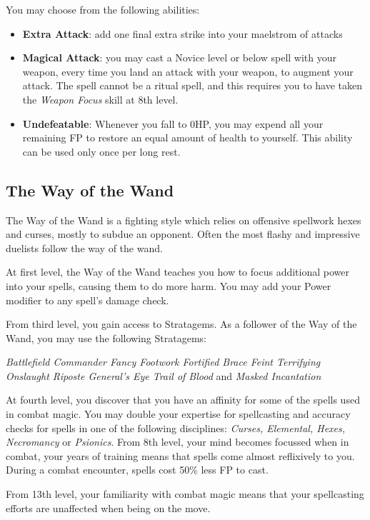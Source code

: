 {{You may choose from the following abilities:
\begin{itemize}
	\item {\bf Extra Attack}: add one final extra strike into your maelstrom of attacks
	\item {\bf Magical Attack}: you may cast a Novice level or below spell with your weapon, every time you land an attack with your weapon, to augment your attack. The spell cannot be a ritual spell, and this requires you to have taken the {\it Weapon Focus} skill at 8th level. 
	\item {\bf Undefeatable}: Whenever you fall to 0HP, you may expend all your remaining FP to restore an equal amount of health to yourself. This ability can be used only once per long rest.
\end{itemize}
}

\newpage
\subsection{\bf The Way of the Wand}

The Way of the Wand is a fighting style which relies on offensive spellwork \minus{} hexes and curses, mostly  \minus{} to subdue an opponent. Often the most flashy and impressive duelists follow the way of the wand. 

{
	At first level, the Way of the Wand teaches you how to focus additional power into your spells, causing them to do more harm. You may add your Power modifier to any spell's damage check.   
}



From third level, you gain access to Stratagems. As a follower of the Way of the Wand, you may use the following Stratagems:

{\it
Battlefield Commander\comma{} Fancy Footwork\comma{} Fortified Brace\comma{} Feint\comma{} Terrifying Onslaught\comma{} Riposte\comma{} General’s Eye\comma{} Trail of Blood } and {\it Masked Incantation
}

{
	At fourth level, you discover that you have an affinity for some of the spells used in combat magic.  You may double your expertise for spellcasting and accuracy checks for spells in one of the following disciplines: {\it  Curses, Elemental, Hexes, Necromancy} or {\it Psionics}. 
}
{
	From 8th level, your mind becomes focussed when in combat, your years of training means that spells come almost reflixively to you. 
	During a combat encounter, spells cost 50\% less FP to cast. 
}
{
	From 13th level, your familiarity with combat magic means that your spellcasting efforts are unaffected when being on the move. 
	
}}
